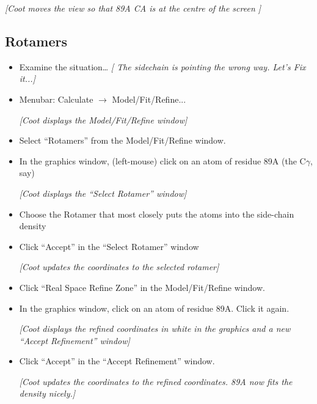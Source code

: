 \documentclass{article}
\begin{document}
\textsl{ [Coot moves the view so that 89A CA is at the centre of the
  screen ]}

\subsection{Rotamers}

\begin{itemize}
\item Examine the situation\ldots
  \emph{[ The sidechain is pointing the wrong way.  Let's Fix it...]}

\item Menubar: \textsf{Calculate $\rightarrow$ Model/Fit/Refine...}

\textsl{ [Coot displays the Model/Fit/Refine window]}

\item Select \textsf{``Rotamers''} from the Model/Fit/Refine window.
  
\item In the graphics window, (left-mouse) click on an atom of residue
  89A (the C$\gamma$, say)

\textsl{ [Coot displays the ``Select Rotamer'' window]}

\item Choose the Rotamer that most closely puts the atoms into the
  side-chain density %

\item Click \textsf{``Accept''} in the ``Select Rotamer'' window

\textsl{ [Coot updates the coordinates to the selected rotamer]}

\item Click \textsf{``Real Space Refine Zone''} in the
  Model/Fit/Refine window.
  
\item In the graphics window, click on an atom of residue 89A.  Click
  it again.
  
  \textsl{ [Coot displays the refined coordinates in white in the
    graphics and a new ``Accept Refinement'' window]}

\item Click \textsf{``Accept''} in the ``Accept Refinement'' window.
  
  \textsl{ [Coot updates the coordinates to the refined coordinates.
    89A now fits the density nicely.]}


\end{itemize}
\end{document}
